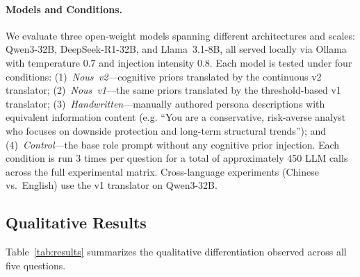 \documentclass[11pt]{article}
\newcommand{\eg}{e.g.}
\begin{document}
\paragraph{Models and Conditions.} We evaluate three open-weight models spanning different architectures and scales: Qwen3-32B, DeepSeek-R1-32B, and Llama~3.1-8B, all served locally via Ollama with temperature 0.7 and injection intensity 0.8. Each model is tested under four conditions: (1)~\emph{Nous~v2}---cognitive priors translated by the continuous v2 translator; (2)~\emph{Nous~v1}---the same priors translated by the threshold-based v1 translator; (3)~\emph{Handwritten}---manually authored persona descriptions with equivalent information content (\eg{} ``You are a conservative, risk-averse analyst who focuses on downside protection and long-term structural trends''); and (4)~\emph{Control}---the base role prompt without any cognitive prior injection. Each condition is run 3 times per question for a total of approximately 450 LLM calls across the full experimental matrix. Cross-language experiments (Chinese vs.\ English) use the v1 translator on Qwen3-32B.

\subsection{Qualitative Results}

Table~\ref{tab:results} summarizes the qualitative differentiation observed across all five questions.
\end{document}
